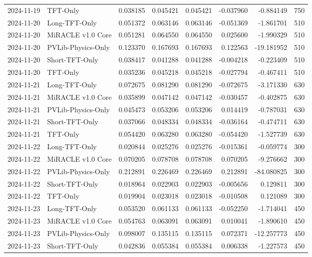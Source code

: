 \begin{tabular}{llrrrrrr}
2024-11-19 & TFT-Only & 0.038185 & 0.045421 & 0.045421 & -0.037960 & -0.884149 & 750 \\
2024-11-20 & Long-TFT-Only & 0.051372 & 0.063146 & 0.063146 & -0.051369 & -1.861701 & 510 \\
2024-11-20 & MiRACLE v1.0 Core & 0.051281 & 0.064550 & 0.064550 & 0.025600 & -1.990329 & 510 \\
2024-11-20 & PVLib-Physics-Only & 0.123370 & 0.167693 & 0.167693 & 0.122563 & -19.181952 & 510 \\
2024-11-20 & Short-TFT-Only & 0.038417 & 0.041288 & 0.041288 & -0.004218 & -0.223409 & 510 \\
2024-11-20 & TFT-Only & 0.035236 & 0.045218 & 0.045218 & -0.027794 & -0.467411 & 510 \\
2024-11-21 & Long-TFT-Only & 0.072675 & 0.081290 & 0.081290 & -0.072675 & -3.171330 & 630 \\
2024-11-21 & MiRACLE v1.0 Core & 0.035899 & 0.047142 & 0.047142 & -0.030457 & -0.402875 & 630 \\
2024-11-21 & PVLib-Physics-Only & 0.045473 & 0.053206 & 0.053206 & 0.014419 & -0.787031 & 630 \\
2024-11-21 & Short-TFT-Only & 0.037066 & 0.048334 & 0.048334 & -0.036164 & -0.474711 & 630 \\
2024-11-21 & TFT-Only & 0.054420 & 0.063280 & 0.063280 & -0.054420 & -1.527739 & 630 \\
2024-11-22 & Long-TFT-Only & 0.020844 & 0.025276 & 0.025276 & -0.015361 & -0.059774 & 300 \\
2024-11-22 & MiRACLE v1.0 Core & 0.070205 & 0.078708 & 0.078708 & 0.070205 & -9.276662 & 300 \\
2024-11-22 & PVLib-Physics-Only & 0.212891 & 0.226469 & 0.226469 & 0.212891 & -84.080825 & 300 \\
2024-11-22 & Short-TFT-Only & 0.018964 & 0.022903 & 0.022903 & -0.005656 & 0.129811 & 300 \\
2024-11-22 & TFT-Only & 0.019904 & 0.023018 & 0.023018 & -0.010508 & 0.121089 & 300 \\
2024-11-23 & Long-TFT-Only & 0.053520 & 0.061133 & 0.061133 & -0.052250 & -1.714041 & 450 \\
2024-11-23 & MiRACLE v1.0 Core & 0.054763 & 0.063091 & 0.063091 & 0.010041 & -1.890610 & 450 \\
2024-11-23 & PVLib-Physics-Only & 0.098007 & 0.135115 & 0.135115 & 0.072371 & -12.257773 & 450 \\
2024-11-23 & Short-TFT-Only & 0.042836 & 0.055384 & 0.055384 & 0.006338 & -1.227573 & 450 \\

\end{tabular}
